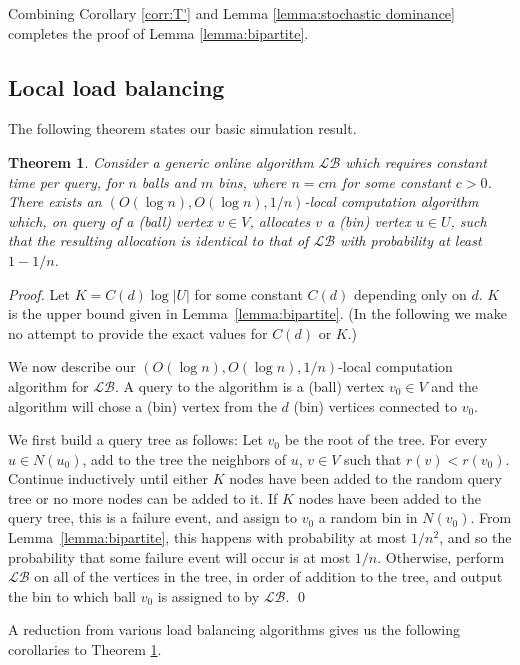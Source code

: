 \documentclass[english, oribibl]{llncs}
\newtheorem{theorem}{Theorem}[section]
\begin{document}
Combining Corollary \ref{corr:T'} and Lemma \ref{lemma:stochastic dominance} completes the proof of Lemma \ref{lemma:bipartite}. 
\subsection{Local load balancing}
The following theorem states our basic simulation result.

\begin{theorem}\label{thm:local_bb}
Consider a generic online algorithm $\mathcal{LB}$ which requires constant time per query, for $n$ balls and $m$ bins, where $n=cm$ for some constant $c>0$.
There exists an
$(O(\log{n}), O(\log{n}), 1/n)$-local computation algorithm
which, on query of a (ball) vertex $v \in V$,
allocates $v$ a (bin) vertex $u \in U$, such that the resulting allocation is identical to that of $\mathcal{LB}$ with probability at least $1-1/n$.
\end{theorem}

\begin{proof}
Let $K=C(d) \log |U|$ for some constant $C(d)$ depending only on $d$.
$K$ is the upper bound given in Lemma~\ref{lemma:bipartite}.
(In the following we make no attempt to provide the exact values for $C(d)$ or $K$.)

We now describe our $(O(\log n), O(\log n), 1/n)$-local computation algorithm for $\mathcal{LB}$.
A query to the algorithm is a (ball) vertex $v_0 \in V$ and the
algorithm will chose a (bin) vertex   from the $d$ (bin) vertices  connected to $v_{0}$.

We first build a query tree as follows:
Let $v_0$ be the root of the tree. For every $u \in N(u_0)$, add to the tree the neighbors of $u$,
$v \in V$ such that $r(v) < r(v_0)$.
Continue inductively until either $K$ nodes have been added to the random query tree
or no more nodes can be added to it.
If $K$ nodes have been added to the query tree, this is a failure event, and assign to $v_0$ a random bin in $N(v_0)$.
From Lemma~\ref{lemma:bipartite}, this happens with probability at most $1/n^2$,
and so the probability that some failure event will occur is at most $1/n$.
Otherwise, perform $\mathcal{LB}$ on all of the vertices in the tree,
in order of addition to the tree, and output the bin to which ball $v_0$ is assigned to by $\mathcal{LB}$. \qed
\end{proof}

A reduction from various load balancing algorithms gives us the following corollaries to Theorem \ref{thm:local_bb}.
\end{document}
